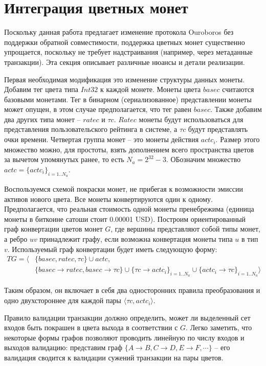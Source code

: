 \documentclass[]{itmo-student-thesis}
\begin{document}
\section{Интеграция цветных монет}

Поскольку данная работа предлагает изменение протокола Ouroboros без
поддержки обратной совместимости, поддержка цветных монет существенно
упрощается, поскольку не требует надстраивания (например, через
метаданные транзакции). Эта секция описывает различные нюансы и детали
реализации.

Первая необходимая модификация это изменение структуры данных
монеты. Добавим тег цвета типа $Int32$ к каждой монете. Монеты цвета
$basec$ считаются базовыми монетами. Тег в бинарном (сериализованное)
представлении монеты может опущен, в этом случае предполагается, что
тег равен $basec$. Также добавим два других типа монет -- $ratec$ и
$\tau c$. $Ratec$ монеты будут использоваться для представления
пользовательского рейтинга в системе, а $\tau c$ будут представлять
очки времени. Четвертая группа монет -- это монеты действия
$actc_i$. Размер этого множество можно, для простоты, взять
дополнением всего пространства цветов за вычетом упомянутых ранее, то
есть $N_a = 2^{32}-3$. ОБозначим множество $actc = \{actc_i\}_{i=1..N_a}$.

Воспользуемся схемой покраски монет, не прибегая к возможности эмиссии
активов нового цвета. Все монеты конвертируются один к
одному. Предполагается, что реальная стоимость одной монеты
пренебрежима (единица монеты в биткоине сатоши стоит 0.00001
USD). Построим ориентированный граф конвертации цветов монет $G$, где
вершины представляют собой типы монет, а ребро $uv$ принадлежит графу,
если возможна конвертация монеты типа $u$ в тип $v$. Используемый граф
конвертации будет иметь следующую форму:
\begin{align*}
  TG = \langle &\{basec, ratec, \tau c\} \cup actc,\\
  &\{basec \rightarrow ratec
  , basec \rightarrow \tau c\} \cup
  \{\tau c \rightarrow actc_i\}_{i=1..N_a} \cup
  \{actc_i \rightarrow \tau c\}_{i=1..N_a}\rangle
\end{align*}

Таким образом, он включает в себя два односторонних правила
преобразования и одно двухстороннее для каждой пары $\langle \tau c,
actc_i\rangle$.

Правило валидации транзакции должно определить, может ли выделенный
сет входов быть покрашен в цвета выхода в соответствии с $G$. Легко
заметить, что некоторые формы графов позволяют проводить линейную по
числу входов и выходов валидацию: представим граф $\{A \rightarrow B,
C \rightarrow D, E \rightarrow F, \cdots\}$ -- его валидация сводится
к валидации сужений транзакции на пары цветов.
\end{document}
